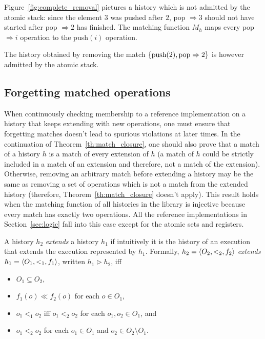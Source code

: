 \begin{example}
  \label{ex:complete_removal}

  Figure~\ref{fig:complete_removal} pictures a history which is not admitted by
  the atomic stack: since the element $3$ was pushed after $2$, pop $\Rightarrow
  3$ should not have started after pop $\Rightarrow 2$ has finished. The
  matching function $M_h$ maps every pop $\Rightarrow i$ operation to the
  push$(i)$ operation.

  The history obtained by removing the match ${\{  \text{push}(2),
  \text{pop}\Rightarrow 2  \}}$ is however admitted by the atomic stack.

\end{example}

\subsection{Forgetting matched operations}

When continuously checking membership to a reference implementation on a
history that keeps extending with new operations, one must ensure that
forgetting matches doesn't lead to spurious violations at later times. In the
continuation of Theorem~\ref{th:match_closure}, one should also prove that a
match of a history $h$ is a match of every extension of $h$ (a match of $h$
could be strictly included in a match of an extension and therefore, not a
match of the extension). Otherwise, removing an arbitrary match before
extending a history may be the same as removing a set of operations which is
not a match from the extended history (therefore,
Theorem~\ref{th:match_closure} doesn't apply). This result holds when the
matching function of all histories in the library is injective because every
match has exactly two operations. All the reference implementations in
Section~\ref{sec:logic} fall into this case except for the atomic sets and
registers.

A history $h_2$ \emph{extends} a history $h_1$ if intuitively it is the history
of an execution that extends the execution represented by $h_1$. Formally, $h_2
= {\langle{O_2,<_2,f_2}\rangle}$ \emph{extends} $h_1 = {\langle{O_1,<_1,f_1}\rangle}$, written $h_1
\vartriangleright h_2$, iff
\begin{itemize}

	\item $O_1\subseteq O_2$, 
	
	\item $f_1(o) \ll f_2(o)$ for each $o \in O_1$,
	
	\item $o_1 <_1 o_2$ iff $o_1 <_2 o_2$ for each $o_1,o_2\in O_1$, and
	
	\item $o_1 <_2 o_2$ for each $o_1\in O_1$ and $o_2\in O_2\setminus O_1$.

\end{itemize}

